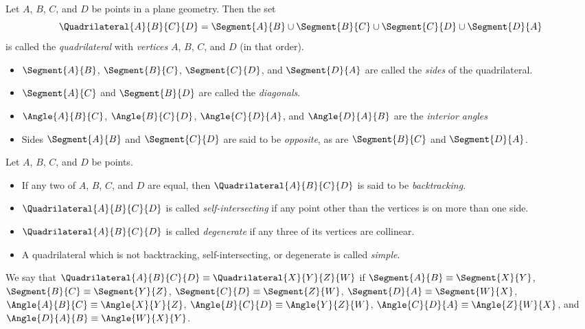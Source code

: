 \documentclass{article}
\begin{document}

\begin{dfn}[Quadrilateral]
Let $A$, $B$, $C$, and $D$ be points in a plane geometry. Then the set \[ \Quadrilateral{A}{B}{C}{D} = \Segment{A}{B} \cup \Segment{B}{C} \cup \Segment{C}{D} \cup \Segment{D}{A} \] is called the \emph{quadrilateral} with \emph{vertices} $A$, $B$, $C$, and $D$ (in that order).
\begin{itemize}
\item $\Segment{A}{B}$, $\Segment{B}{C}$, $\Segment{C}{D}$, and $\Segment{D}{A}$ are called the \emph{sides} of the quadrilateral.
\item $\Segment{A}{C}$ and $\Segment{B}{D}$ are called the \emph{diagonals}.
\item $\Angle{A}{B}{C}$, $\Angle{B}{C}{D}$, $\Angle{C}{D}{A}$, and $\Angle{D}{A}{B}$ are the \emph{interior angles}
\item Sides $\Segment{A}{B}$ and $\Segment{C}{D}$ are said to be \emph{opposite}, as are $\Segment{B}{C}$ and $\Segment{D}{A}$.
\end{itemize}
\end{dfn}

\begin{dfn}
Let $A$, $B$, $C$, and $D$ be points.
\begin{itemize}
\item If any two of $A$, $B$, $C$, and $D$ are equal, then $\Quadrilateral{A}{B}{C}{D}$ is said to be \emph{backtracking}.
\item $\Quadrilateral{A}{B}{C}{D}$ is called \emph{self-intersecting} if any point other than the vertices is on more than one side.
\item $\Quadrilateral{A}{B}{C}{D}$ is called \emph{degenerate} if any three of its vertices are collinear.
\item A quadrilateral which is not backtracking, self-intersecting, or degenerate is called \emph{simple}.
\end{itemize}
\end{dfn}

\begin{dfn}
We say that $\Quadrilateral{A}{B}{C}{D} \equiv \Quadrilateral{X}{Y}{Z}{W}$ if $\Segment{A}{B} \equiv \Segment{X}{Y}$, $\Segment{B}{C} \equiv \Segment{Y}{Z}$, $\Segment{C}{D} \equiv \Segment{Z}{W}$, $\Segment{D}{A} \equiv \Segment{W}{X}$, $\Angle{A}{B}{C} \equiv \Angle{X}{Y}{Z}$, $\Angle{B}{C}{D} \equiv \Angle{Y}{Z}{W}$, $\Angle{C}{D}{A} \equiv \Angle{Z}{W}{X}$, and $\Angle{D}{A}{B} \equiv \Angle{W}{X}{Y}$.
\end{dfn}
\end{document}

